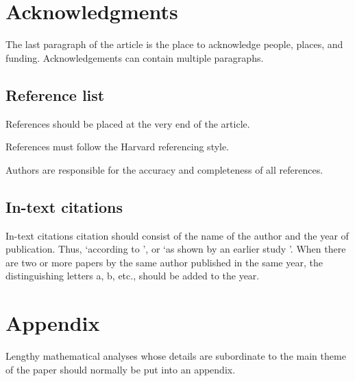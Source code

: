 \documentclass[10pt]{article}
\begin{document}
\section{Acknowledgments}
\label{Acknowledgments}
The last paragraph of the article is the place to acknowledge people, places, and funding. Acknowledgements can contain multiple paragraphs.





\subsection{Reference list}
\label{ReferenceList}
References should be placed at the very end of the article.

References must follow the Harvard referencing style.

Authors are responsible for the accuracy and completeness of all references.

\subsection{In-text citations}
\label{IntextCitations}
In-text citations citation should consist of the name of the author and the year of publication. Thus, `according to \citet{David2013,Linden2009,Trewin2010}', or `as shown by an earlier study \cite{Budin1985}'. When there are two or more papers by the same author published in the same year, the distinguishing letters a, b, etc., should be added to the year.


\section{Appendix}
\label{Appendix}
Lengthy mathematical analyses whose details are subordinate to the main theme of the paper should normally be put into an appendix.
\end{document}
